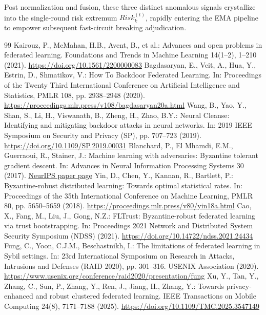 \documentclass[11pt, a4paper]{article}
\begin{document}
Post normalization and fusion, these three distinct anomalous signals crystallize into the single-round risk extremum $Risk_{k}^{(t)}$, rapidly entering the EMA pipeline to empower subsequent fast-circuit breaking adjudication.

\begin{thebibliography}{99}
     Kairouz, P., McMahan, H.B., Avent, B., et al.: Advances and open problems in federated learning. Foundations and Trends in Machine Learning 14(1--2), 1--210 (2021). \url{https://doi.org/10.1561/2200000083}
     Bagdasaryan, E., Veit, A., Hua, Y., Estrin, D., Shmatikov, V.: How To Backdoor Federated Learning. In: Proceedings of the Twenty Third International Conference on Artificial Intelligence and Statistics, PMLR 108, pp. 2938--2948 (2020). \url{https://proceedings.mlr.press/v108/bagdasaryan20a.html}
     Wang, B., Yao, Y., Shan, S., Li, H., Viswanath, B., Zheng, H., Zhao, B.Y.: Neural Cleanse: Identifying and mitigating backdoor attacks in neural networks. In: 2019 IEEE Symposium on Security and Privacy (SP), pp. 707--723 (2019). \url{https://doi.org/10.1109/SP.2019.00031}
     Blanchard, P., El Mhamdi, E.M., Guerraoui, R., Stainer, J.: Machine learning with adversaries: Byzantine tolerant gradient descent. In: Advances in Neural Information Processing Systems 30 (2017). \href{https://papers.nips.cc/paper/6617-machine-learning-with-adversaries-byzantine-tolerant-gradient-descent}{NeurIPS paper page}
     Yin, D., Chen, Y., Kannan, R., Bartlett, P.: Byzantine-robust distributed learning: Towards optimal statistical rates. In: Proceedings of the 35th International Conference on Machine Learning, PMLR 80, pp. 5650--5659 (2018). \url{https://proceedings.mlr.press/v80/yin18a.html}
     Cao, X., Fang, M., Liu, J., Gong, N.Z.: FLTrust: Byzantine-robust federated learning via trust bootstrapping. In: Proceedings 2021 Network and Distributed System Security Symposium (NDSS) (2021). \url{https://doi.org/10.14722/ndss.2021.24434}
     Fung, C., Yoon, C.J.M., Beschastnikh, I.: The limitations of federated learning in Sybil settings. In: 23rd International Symposium on Research in Attacks, Intrusions and Defenses (RAID 2020), pp. 301--316. USENIX Association (2020). \url{https://www.usenix.org/conference/raid2020/presentation/fung}
     Xu, Y., Tan, Y., Zhang, C., Sun, P., Zhang, Y., Ren, J., Jiang, H., Zhang, Y.: Towards privacy-enhanced and robust clustered federated learning. IEEE Transactions on Mobile Computing 24(8), 7171--7188 (2025). \url{https://doi.org/10.1109/TMC.2025.3547149}

\end{thebibliography}
\end{document}
